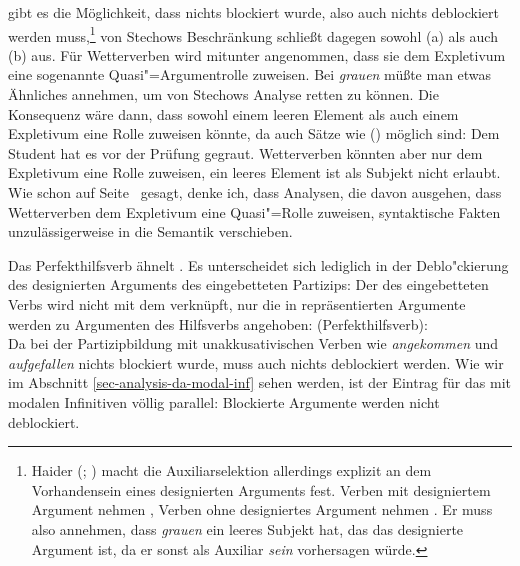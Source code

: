 gibt es die Möglichkeit, dass nichts blockiert wurde, also auch nichts deblockiert werden muss,\footnote{
        Haider (\citeyear[]{Haider84a}; \citeyear[]{Haider86}) macht die Auxiliarselektion allerdings explizit
        an dem Vorhandensein eines designierten Arguments fest. Verben mit designiertem
        Argument nehmen \haben, Verben ohne designiertes Argument nehmen \sein. Er muss
        also annehmen, dass \emph{grauen} ein leeres Subjekt hat, das das designierte
        Argument ist, da er sonst als Auxiliar \emph{sein} vorhersagen würde.%
}
von Stechows Beschränkung schließt dagegen sowohl (a) als auch (b) aus.
Für Wetterverben wird mitunter angenommen, dass sie dem Expletivum eine sogenannte
Quasi"=Argumentrolle zuweisen. Bei \emph{grauen} müßte man
etwas Ähnliches annehmen, um von Stechows Analyse retten zu können. Die Konsequenz wäre dann, dass \grauen
sowohl einem leeren Element als auch einem Expletivum eine Rolle zuweisen könnte,
da auch Sätze wie () möglich sind:
\ea
Dem Student hat es vor der Prüfung gegraut.
\z
Wetterverben könnten aber nur dem Expletivum eine Rolle zuweisen, ein leeres
Element ist als Subjekt nicht erlaubt. Wie schon auf Seite~\pageref{page-syntaktisierung} gesagt,
denke ich, dass Analysen, die davon ausgehen, dass Wetterverben dem Expletivum eine Quasi"=Rolle
zuweisen, syntaktische Fakten unzulässigerweise in die Semantik verschieben. 

Das Perfekthilfsverb \sein ähnelt \haben. Es unterscheidet sich lediglich 
in der Deblo"ckierung des designierten Arguments des eingebetteten Partizips: Der \subjw
des eingebetteten Verbs wird nicht mit dem \compsw verknüpft, nur die in \comps repräsentierten
Argumente  werden zu Argumenten des Hilfsverbs angehoben:
\eas
\mbox{\sein (Perfekthilfsverb):}\\
\label{le-sein-perfekt}
\zs
Da bei der Partizipbildung mit unakkusativischen Verben wie \emph{angekommen} und \emph{aufgefallen}
nichts blockiert wurde, muss auch nichts deblockiert werden. Wie wir im
Abschnitt \ref{sec-analysis-da-modal-inf} sehen werden, ist der Eintrag für das \sein mit modalen
Infinitiven völlig parallel: Blockierte Argumente werden nicht deblockiert.


